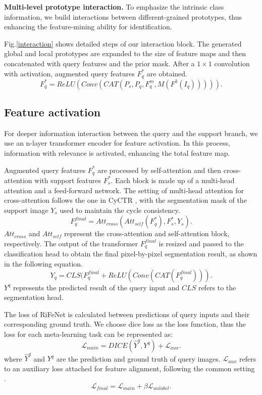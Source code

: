 \documentclass[letterpaper]{article} %
\begin{document}
\textbf{Multi-level prototype interaction.}
To emphasize the intrinsic class information, we build interactions between different-grained prototypes, thus enhancing the feature-mining ability for identification.

Fig.\ref{interaction} shows detailed steps of our interaction block. The generated global and local prototypes are expanded to the size of feature maps and then concatenated with query features and the prior mask. After a $1\times1$ convolution with activation, augmented query features $F^{*}_q$ are obtained.
\begin{equation}
F^{*}_q = ReLU(Conv(CAT(P_s,P_q,F^{m}_q,M(F^3(I_q))))).
\end{equation}%

\subsection{Feature activation}
For deeper information interaction between the query and the support branch, we use an n-layer transformer encoder for feature activation. In this process, information with relevance is activated, enhancing the total feature map.

Augmented query features $F^{*}_q$ are processed by self-attention and then cross-attention with support features $F^{*}_s$. Each block is made up of a multi-head attention and a feed-forward network. The setting of multi-head attention for cross-attention follows the one in CyCTR \cite{zhang2021few}, with the segmentation mask of the support image $Y_s$ used to maintain the cycle consistency.
\begin{equation}
F^{final}_q = Att_{cross}(Att_{self}(F^{*}_q),F^{*}_s,Y_s).
\end{equation}%
$Att_{cross}$ and $Att_{self}$ represent the cross-attention and self-attention block, respectively. The output of the transformer $F^{final}_q$ is resized and passed to the classification head to obtain the final pixel-by-pixel segmentation result, as shown in the following equation.
\begin{equation}
Y_q = CLS(F^{final}_q+ReLU(Conv(CAT(F^{final}_q))).
\end{equation}%
$Y^q$ represents the predicted result of the query input and $CLS$ refers to the segmentation head.

The loss of RiFeNet is calculated between predictions of query inputs and their corresponding ground truth. We choose dice loss as the loss function, thus the loss for each meta-learning task can be represented as:
\begin{equation}
\mathcal{L}_{main} = DICE (\hat{Y}^q,Y^q) + \mathcal{L}_{aux}.
\end{equation}%
where $\hat{Y}^q$ and ${Y}^q$ are the prediction and ground truth of query images. $\mathcal{L}_{aux}$ refers to an auxiliary loss attached for feature alignment, following the common setting \cite{milletari2016v}.
\begin{equation}
\mathcal{L}_{final} = \mathcal{L}_{main} + \beta \mathcal{L}_{unlabel}.
\end{equation}%
\end{document}
